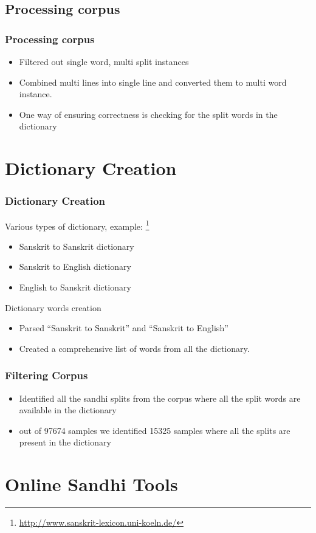 \documentclass[xcolor=dvipsnames]{beamer}
\begin{document}
\subsection{Processing corpus}
\begin{frame}
\frametitle{Processing corpus}
\begin{itemize}
\item Filtered out single word, multi split instances
\item Combined multi lines into single line and converted them to multi word instance.
\item One way of ensuring correctness is checking for the split words in the dictionary
\end{itemize}
\end{frame}

\section{Dictionary Creation}
\begin{frame}
\frametitle{Dictionary Creation}
Various types of dictionary, example: \footnote{\url{http://www.sanskrit-lexicon.uni-koeln.de/}}
\begin{itemize}
\item Sanskrit to Sanskrit dictionary
\item Sanskrit to English dictionary
\item English to Sanskrit dictionary
\end{itemize}
Dictionary words creation
\begin{itemize}
\item Parsed ``Sanskrit to Sanskrit'' and ``Sanskrit to English'' 
\item Created a comprehensive list of words from all the dictionary.
\end{itemize}
\end{frame}

\begin{frame}
\frametitle{Filtering Corpus}
\begin{itemize}
\item Identified all the sandhi splits from the corpus where all the split words are available in the dictionary
\item out of 97674 samples we identified 15325 samples where all the splits are present in the dictionary
\end{itemize}
\end{frame}

\section{Online Sandhi Tools}
\end{document}

